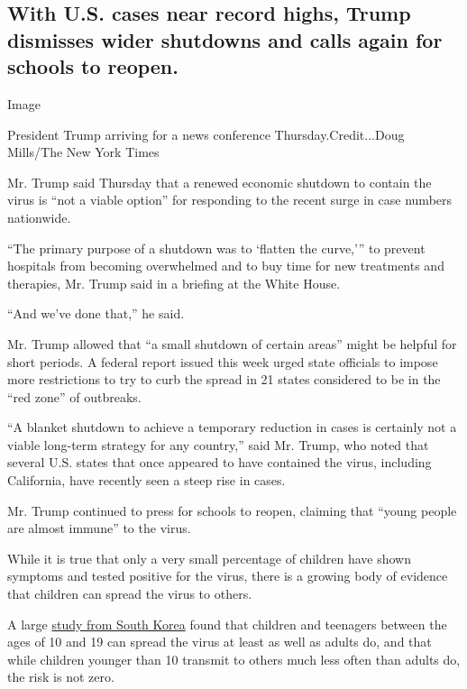\hypertarget{with-us-cases-near-record-highs-trump-dismisses-wider-shutdowns-and-calls-again-for-schools-to-reopen}{%
\subsection{With U.S. cases near record highs, Trump dismisses wider
shutdowns and calls again for schools to
reopen.}\label{with-us-cases-near-record-highs-trump-dismisses-wider-shutdowns-and-calls-again-for-schools-to-reopen}}

Image

President Trump arriving for a news conference Thursday.Credit...Doug
Mills/The New York Times

Mr. Trump said Thursday that a renewed economic shutdown to contain the
virus is ``not a viable option'' for responding to the recent surge in
case numbers nationwide.

``The primary purpose of a shutdown was to `flatten the curve,''' to
prevent hospitals from becoming overwhelmed and to buy time for new
treatments and therapies, Mr. Trump said in a briefing at the White
House.

``And we've done that,'' he said.

Mr. Trump allowed that ``a small shutdown of certain areas'' might be
helpful for short periods. A federal report issued this week urged state
officials to impose more restrictions to try to curb the spread in 21
states considered to be in the ``red zone'' of outbreaks.

``A blanket shutdown to achieve a temporary reduction in cases is
certainly not a viable long-term strategy for any country,'' said Mr.
Trump, who noted that several U.S. states that once appeared to have
contained the virus, including California, have recently seen a steep
rise in cases.

Mr. Trump continued to press for schools to reopen, claiming that
``young people are almost immune'' to the virus.

While it is true that only a very small percentage of children have
shown symptoms and tested positive for the virus, there is a growing
body of evidence that children can spread the virus to others.

A large
\href{https://www.nytimes3xbfgragh.onion/2020/07/18/health/coronavirus-children-schools.html}{study
from South Korea} found that children and teenagers between the ages of
10 and 19 can spread the virus at least as well as adults do, and that
while children younger than 10 transmit to others much less often than
adults do, the risk is not zero.


